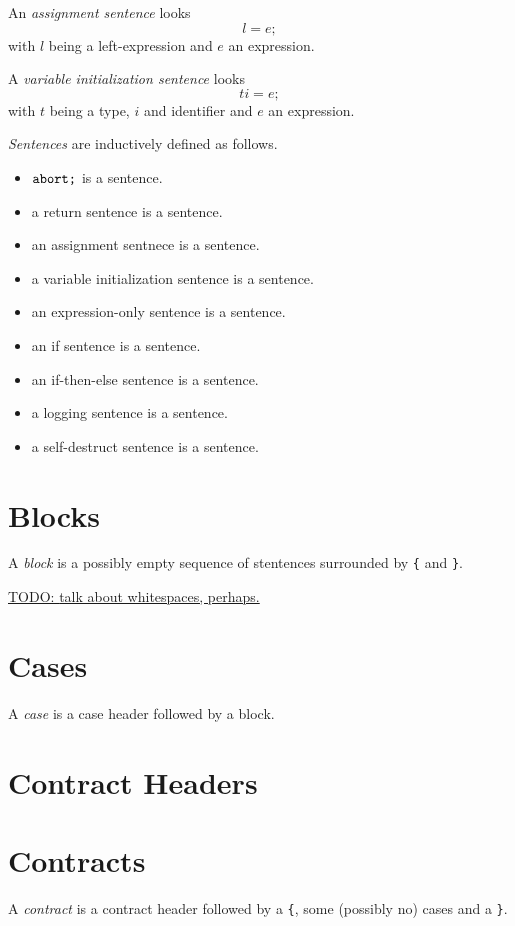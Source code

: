 \documentclass{book}
\newcommand{\todo}[1]{\underline{TODO: {#1}}}
\begin{document}
An \textit{assignment sentence} looks
\[
l = e;
\]
with $l$ being a left-expression and $e$ an expression.

A \textit{variable initialization sentence} looks
\[
t i = e;
\]
with $t$ being a type, $i$ and identifier and $e$ an expression.

\textit{Sentences} are inductively defined as follows.

\begin{itemize}
\item $\text{\texttt{abort;}}$ is a sentence.
\item a return sentence is a sentence.
\item an assignment sentnece is a sentence.
\item a variable initialization sentence is a sentence.
\item an expression-only sentence is a sentence.
\item an if sentence is a sentence.
\item an if-then-else sentence is a sentence.
\item a logging sentence is a sentence.
\item a self-destruct sentence is a sentence.
\end{itemize}

\section{Blocks}

A \textit{block} is a possibly empty sequence of stentences surrounded by \texttt{\{} and \texttt{\}}.

\todo{talk about whitespaces, perhaps.}

\section{Cases}

A \textit{case} is a case header followed by a block.


\section{Contract Headers}

\section{Contracts}

A \textit{contract} is a contract header followed by a \texttt{\{}, some (possibly no) cases and a \texttt{\}}.
\end{document}
